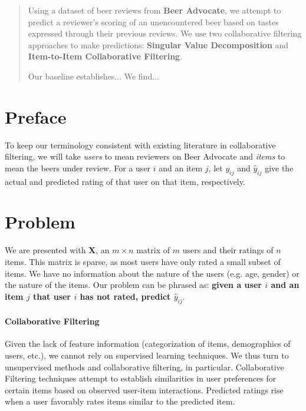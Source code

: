 \documentclass[12pt]{article}
\begin{document}
\maketitle
\begin{abstract}
Using a dataset of beer reviews from \textbf{Beer Advocate}, we attempt to predict a reviewer's scoring of an unencountered beer based on tastes expressed through their previous reviews. We use two collaborative filtering approaches to make predictions: \textbf{Singular Value Decomposition} and \textbf{Item-to-Item Collaborative Filtering}.

Our baseline establishes...
We find...

\end{abstract}



\section{Preface}
To keep our terminology consistent with existing literature in collaborative filtering, we will take \textit{users} to mean reviewers on Beer Advocate and \textit{items} to mean the beers under review. For a user $i$ and an item $j$, let $y_{ij}$ and $\hat y_{ij}$ give the actual and predicted rating of that user on that item, respectively.

\section{Problem}
We are presented with $\mathbf{X}$, an $m \times n$ matrix of $m$ users and their ratings of $n$ items. This matrix is sparse, as most users have only rated a small subset of items. We have no information about the nature of the users (e.g. age, gender) or the nature of the items. Our problem can be phrased as: \textbf{given a user $i$ and an item $j$ that user $i$ has not rated, predict $\hat y_{ij}$}.

\paragraph{Collaborative Filtering} Given the lack of feature information (categorization of items, demographics of users, etc.), we cannot rely on supervised learning techniques. We thus turn to unsupervised methods and collaborative filtering, in particular. Collaborative Filtering techniques attempt to establish similarities in user preferences for certain items based on observed user-item interactions. Predicted ratings rise when a user favorably rates items similar to the predicted item.
\end{document}

